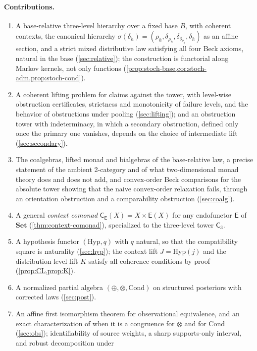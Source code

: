 \documentclass[11pt]{article}
\theoremstyle{definition}
\theoremstyle{remark}
\newcommand{\Set}{\mathbf{Set}}
\newcommand{\Hyp}{\mathrm{Hyp}}
\newcommand{\Cond}{\mathrm{Cond}}
\newcommand{\C}{\mathsf{C}}
\newcommand{\E}{\mathsf{E}}
\begin{document}
\paragraph{Contributions.}
\begin{enumerate}[leftmargin=*]
\item A base-relative three-level hierarchy over a fixed base $B$, with coherent contexts, the
  canonical hierarchy $\sigma(\delta_h)=(\rho_h,\delta_{\rho_h},\delta_{\delta_{\rho_h}},\delta_h)$ as an
  affine section, and a strict mixed distributive law satisfying all four Beck axioms, natural in the
  base (\cref{sec:relative}); the construction is functorial along Markov kernels, not only functions
  (\cref{prop:stoch-base,cor:stoch-adm,prop:stoch-cond}).
\item A coherent lifting problem for claims against the tower, with level-wise obstruction
  certificates, strictness and monotonicity of failure levels, and the behavior of obstructions under
  pooling (\cref{sec:lifting}); and an obstruction tower with indeterminacy, in which a secondary
  obstruction, defined only once the primary one vanishes, depends on the choice of intermediate lift
  (\cref{sec:secondary}).
\item The coalgebras, lifted monad and bialgebras of the base-relative law, a precise statement of
  the ambient 2-category and of what two-dimensional monad theory does and does not add, and
  convex-order Beck comparisons for the absolute tower showing that the naive convex-order
  relaxation fails, through an orientation obstruction and a comparability obstruction
  (\cref{sec:coalg}).
\item A general \emph{context comonad} $\C_\E(X)=X\times\E(X)$ for any endofunctor $\E$ of $\Set$
  (\cref{thm:context-comonad}), specialized to the three-level tower $\C_3$.
\item A hypothesis functor $(\Hyp,q)$ with $q$ natural, so that the compatibility square is
  naturality (\cref{sec:hyp}); the context lift $J=\Hyp(j)$ and the distribution-level lift $K$
  satisfy all coherence conditions by proof (\cref{prop:CL,prop:K}).
\item A normalized partial algebra $(\oplus,\otimes,\Cond)$ on structured posteriors with corrected
  laws (\cref{sec:post}).
\item An affine first isomorphism theorem for observational equivalence, and an exact
  characterization of when it is a congruence for $\otimes$ and for $\Cond$ (\cref{sec:obs});
  identifiability of source weights, a sharp supports-only interval, and robust decomposition under

\end{enumerate}
\end{document}
